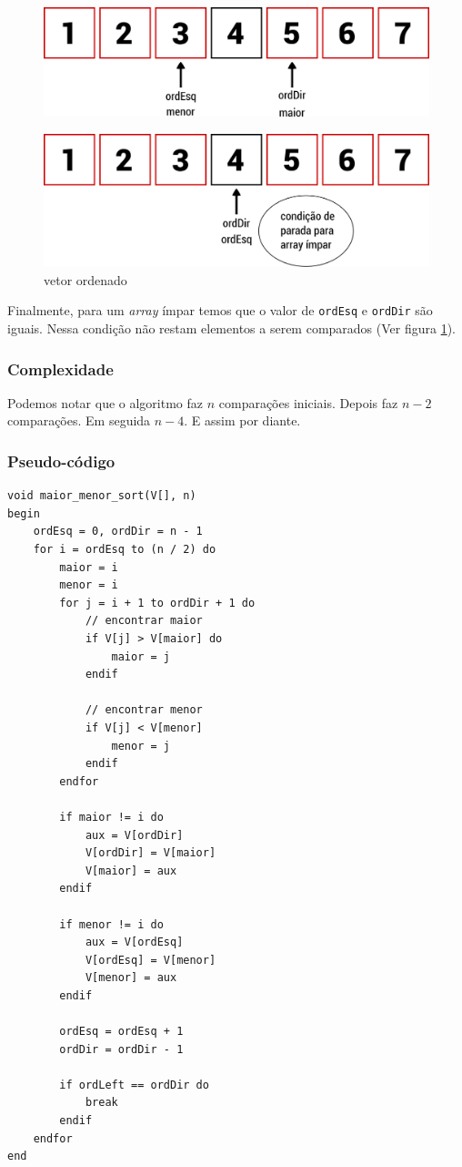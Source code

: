 \begin{figure}[p]
   \includegraphics[scale=0.6]{img/maior.menor.algoritmo/passo6.png}
\end{figure}

\begin{figure}[p]
   \includegraphics[scale=0.6]{img/maior.menor.algoritmo/passo7.png}
   \caption{vetor ordenado}
   \label{fig:passo7}
\end{figure}

Finalmente, para um \emph{array} ímpar temos que o valor de
\texttt{ordEsq} e \texttt{ordDir} são iguais. Nessa condição não restam
elementos a serem comparados (Ver figura \ref{fig:passo7}).

\subsubsection{Complexidade}

Podemos notar que o algoritmo faz $n$ comparações iniciais. Depois faz
$n - 2$ comparações. Em seguida $n - 4$. E assim por diante.

\subsubsection{Pseudo-código}

\begin{verbatim}
void maior_menor_sort(V[], n)
begin
    ordEsq = 0, ordDir = n - 1
    for i = ordEsq to (n / 2) do
        maior = i
        menor = i
        for j = i + 1 to ordDir + 1 do
            // encontrar maior
            if V[j] > V[maior] do
                maior = j
            endif

            // encontrar menor
            if V[j] < V[menor]
                menor = j
            endif
        endfor

        if maior != i do
            aux = V[ordDir]
            V[ordDir] = V[maior]
            V[maior] = aux
        endif

        if menor != i do
            aux = V[ordEsq]
            V[ordEsq] = V[menor]
            V[menor] = aux
        endif

        ordEsq = ordEsq + 1
        ordDir = ordDir - 1

        if ordLeft == ordDir do
            break
        endif
    endfor
end
\end{verbatim}

